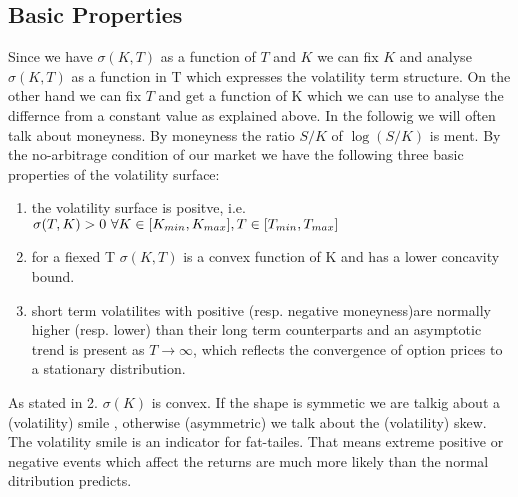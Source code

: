 \documentclass[12pt]{article}
\begin{document}
\subsection{Basic Properties}
Since we have $\sigma(K,T)$ as a function of $T$ and $K$ we can fix $K$ and analyse $\sigma(K,T)$ as a function in T which expresses the volatility term structure. On the other hand we can fix $T$ and get a function of K which we can use to analyse the differnce from a constant value as explained above. In the followig we will often talk about moneyness. By moneyness the ratio $S/K$ of $\log(S/K)$ is ment.
By the no-arbitrage condition of our market we have the following three basic properties of the volatility surface:
\begin{enumerate}
\item the volatility surface is positve, i.e. $\sigma(T,K)>0 ~\forall K \in [K_{min},K_{max}],\\T \in [T_{min},T_{max}]$
\item for a fiexed T $\sigma(K,T)$ is a convex function of K and has a lower concavity bound.
\item short term volatilites with positive (resp. negative moneyness)are normally higher (resp. lower) than their long term counterparts and an asymptotic trend is present as $T \rightarrow \infty$, which reflects the convergence of option prices to a stationary distribution.
\end{enumerate}
As stated in 2. $\sigma(K)$ is convex. If the shape is symmetic we are talkig about a (volatility) smile , otherwise (asymmetric) we talk about the (volatility) skew.\\
The volatility smile is an indicator for fat-tailes. That means extreme positive or negative events which affect the returns are much more likely than the normal ditribution predicts.
\end{document}
